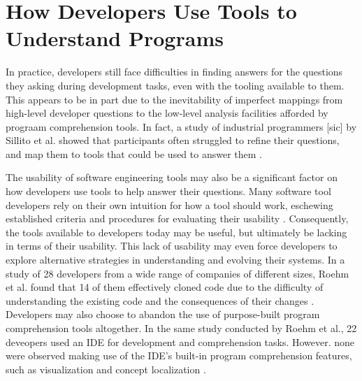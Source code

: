 
\section{How Developers Use Tools to Understand Programs}
\label{sec:HowDevelopersUseToolsToUnderstandPrograms}

\noindent In practice, developers still face difficulties in finding answers 
for the questions they asking during development tasks, even with the tooling 
available to them.
This appears to be in part due to the inevitability of imperfect mappings from
high-level developer questions to the low-level analysis facilities afforded
by prograam comprehension tools.
In fact, a study of industrial programmers [sic] by Sillito et al. showed that 
participants often struggled to refine their questions, and map them to tools
that could be used to answer them \cite{sillito-2006-questions-during-task}.

\par The usability of software engineering tools may also be a significant
factor on how developers use tools to help answer their questions.
Many software tool developers rely on their own intuition for how a tool should
work, eschewing established criteria and procedures for evaluating their 
usability \cite{toleman-98-soft-tools}.
Consequently, the tools available to developers today may be useful, but
ultimately be lacking in terms of their usability.
This lack of usability may even force developers to explore alternative
strategies in understanding and evolving their systems.
In a study of 28 developers from a wide range of companies of different sizes,
Roehm et al. found that 14 of them effectively cloned code due to the
difficulty of understanding the existing code and the consequences of their
changes \cite{roehm-2012-comprehend-software}.
Developers may also choose to abandon the use of purpose-built program
comprehension tools altogether.
In the same study conducted by Roehm et al., 22 deveopers used an \ac{IDE}
for development and comprehension tasks.
However. none were observed making use of the IDE's built-in program 
comprehension features, such as visualization and concept localization
\cite{roehm-2012-comprehend-software}.

